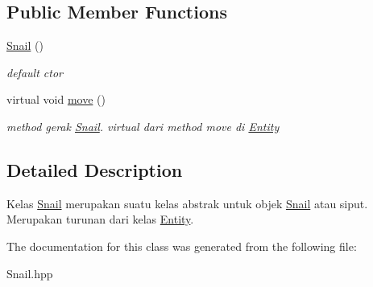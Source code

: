 \subsection*{Public Member Functions}
\begin{DoxyCompactItemize}
\item 
\mbox{\label{classSnail_ac5501ca7ead01b2ba0b7286503599f68}} 
\hyperlink{classSnail_ac5501ca7ead01b2ba0b7286503599f68}{Snail} ()
\begin{DoxyCompactList}\small\item\em default ctor \end{DoxyCompactList}\item 
\mbox{\label{classSnail_a47d29cb68815627114634e5f5739a591}} 
virtual void \hyperlink{classSnail_a47d29cb68815627114634e5f5739a591}{move} ()
\begin{DoxyCompactList}\small\item\em method gerak \hyperlink{classSnail}{Snail}. virtual dari method move di \hyperlink{classEntity}{Entity} \end{DoxyCompactList}\end{DoxyCompactItemize}


\subsection{Detailed Description}
Kelas \hyperlink{classSnail}{Snail} merupakan suatu kelas abstrak untuk objek \hyperlink{classSnail}{Snail} atau siput. Merupakan turunan dari kelas \hyperlink{classEntity}{Entity}. 

The documentation for this class was generated from the following file\+:\begin{DoxyCompactItemize}
\item 
Snail.\+hpp\end{DoxyCompactItemize}
